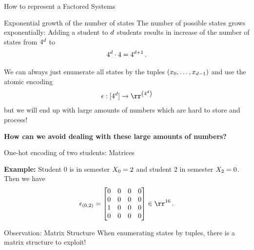 \documentclass{beamer}
\begin{document}
    \begin{frame}{How to represent a Factored Systems}

        \begin{block}{Exponential growth of the number of states}
            The number of possible states grows exponentially:
            Adding a student to $d$ students results in increase of the number of states from $4^{d}$ to
            \[ 4^{d}\cdot 4 = 4^{d+1} \, . \]
        \end{block}

        We can always just enumerate all states by the tuples $(x_{0},\ldots,x_{d-1})$ and use the atomic encoding
        \[ \onehotmap : [4^\atomorder] \rightarrow \rr^{\left(4^{\atomorder}\right)} \]
        but we will end up with large amounts of numbers which are hard to store and process!

        \begin{center}
            \bf How can we avoid dealing with these large amounts of numbers?
        \end{center}


    \end{frame}






    \begin{frame}{One-hot encoding of two students: Matrices}

        \textbf{Example:} Student $0$ is in semester $X_{0}=2$ and student $2$ in semester $X_{2}=0$.
        Then we have
        \begin{align}
            \onehotmapof{(0,2)}
            =
            \begin{bmatrix}
                0 & 0 & 0 & 0 \\
                0 & 0 & 0 & 0 \\
                1 & 0 & 0 & 0 \\
                0 & 0 & 0 & 0
            \end{bmatrix} \in \rr^{16}\, .
        \end{align}

        \begin{block}{Observation: Matrix Structure}
            When enumerating states by tuples, there is a matrix structure to exploit!
        \end{block}

    \end{frame}
\end{document}
